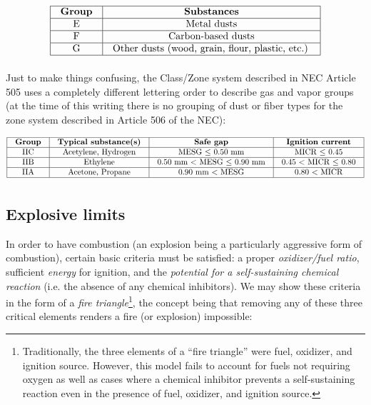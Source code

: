 $$\vbox{\offinterlineskip
\halign{\strut
\vrule \quad\hfil # \ \hfil & 
\vrule \quad\hfil # \ \hfil \vrule \cr
\noalign{\hrule}
%
\textbf{Group} & \textbf{Substances} \cr
%
\noalign{\hrule}
%
E & Metal dusts \cr
%
\noalign{\hrule}
%
F & Carbon-based dusts \cr
%
\noalign{\hrule}
%
G & Other dusts (wood, grain, flour, plastic, etc.) \cr
%
\noalign{\hrule}
} %
}$$ %

\vskip 10pt

Just to make things confusing, the Class/Zone system described in NEC Article 505 uses a completely different lettering order to describe gas and vapor groups (at the time of this writing there is no grouping of dust or fiber types for the zone system described in Article 506 of the NEC):


$$\vbox{\offinterlineskip
\halign{\strut
\vrule \quad\hfil # \ \hfil & 
\vrule \quad\hfil # \ \hfil & 
\vrule \quad\hfil # \ \hfil & 
\vrule \quad\hfil # \ \hfil \vrule \cr
\noalign{\hrule}
%
\textbf{Group} & \textbf{Typical substance(s)} & \textbf{Safe gap} & \textbf{Ignition current} \cr
%
\noalign{\hrule}
%
IIC & Acetylene, Hydrogen & MESG $\leq$ 0.50 mm & MICR $\leq$ 0.45 \cr
%
\noalign{\hrule}
%
IIB & Ethylene & 0.50 mm $<$ MESG $\leq$ 0.90 mm & 0.45 $<$ MICR $\leq$ 0.80 \cr
%
\noalign{\hrule}
%
IIA & Acetone, Propane & 0.90 mm $<$ MESG & 0.80 $<$ MICR \cr
%
\noalign{\hrule}
} %
}$$ %







\filbreak
\subsection{Explosive limits}

In order to have combustion (an explosion being a particularly aggressive form of combustion), certain basic criteria must be satisfied: a proper \textit{oxidizer/fuel ratio}, sufficient \textit{energy} for ignition, and the \textit{potential for a self-sustaining chemical reaction} (i.e. the absence of any chemical inhibitors).  We may show these criteria in the form of a \textit{fire triangle}\footnote{Traditionally, the three elements of a ``fire triangle'' were fuel, oxidizer, and ignition source.  However, this model fails to account for fuels not requiring oxygen as well as cases where a chemical inhibitor prevents a self-sustaining reaction even in the presence of fuel, oxidizer, and ignition source.}, the concept being that removing any of these three critical elements renders a fire (or explosion) impossible:  

